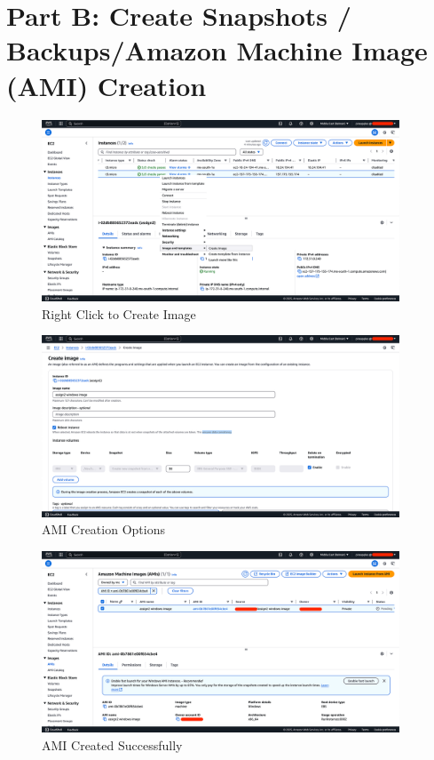 \documentclass[a4paper,12pt]{article}
\begin{document}
\section{Part B: Create Snapshots / Backups/Amazon Machine Image (AMI) Creation}

\begin{figure}[H]
    \centering
    \includegraphics[width=0.95\textwidth]{create-image-1.png}
    \caption{Right Click to Create Image}
    \label{fig:image1}
\end{figure}

\begin{figure}[H]
    \centering
    \includegraphics[width=0.95\textwidth]{create-image-2.png}
    \caption{AMI Creation Options}
    \label{fig:image2}
\end{figure}

\begin{figure}[H]
    \centering
    \includegraphics[width=0.95\textwidth]{create-image-3.png}
    \caption{AMI Created Successfully}
    \label{fig:image3}
\end{figure}
\end{document}
